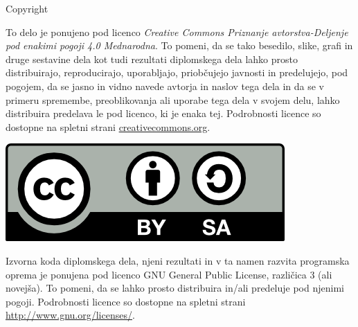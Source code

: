 

{\sc Copyright}




{\small \noindent
To delo je ponujeno pod licenco
\textit{Creative Commons Priznanje avtorstva-Deljenje pod enakimi pogoji 4.0 Mednarodna}.
To pomeni, da se tako besedilo, slike, grafi in druge sestavine dela kot tudi rezultati
diplomskega dela lahko prosto distribuirajo, reproducirajo, uporabljajo, priobčujejo javnosti
in predelujejo, pod pogojem, da se jasno in vidno navede avtorja in naslov tega dela in da se v
primeru spremembe, preoblikovanja ali uporabe tega dela v svojem delu, lahko distribuira
predelava le pod licenco, ki je enaka tej.
Podrobnosti licence so dostopne na spletni strani
\href{https://creativecommons.org/licenses/by-sa/4.0/deed.sl}{creativecommons.org}.
}

\vspace*{1cm}
\begin{center}
    \includegraphics{resources/copyright/cc-by-sa.png}
\end{center}

\vspace*{1cm}
{\small \noindent
    Izvorna koda diplomskega dela, njeni rezultati in v ta namen razvita programska oprema je
    ponujena pod licenco GNU General Public License, različica 3 (ali novejša).
    To pomeni, da se lahko prosto distribuira in/ali predeluje pod njenimi pogoji.
    Podrobnosti licence so dostopne na spletni strani \url{http://www.gnu.org/licenses/}.
}
